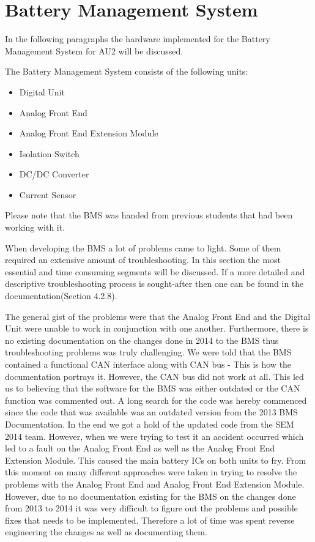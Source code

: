 \section{Battery Management System}
In the following paragraphs the hardware implemented for the Battery Management System for AU2 will be discussed. 

The Battery Management System consists of the following units:
\begin{itemize}
	\item{Digital Unit}
	\item{Analog Front End}
	\item{Analog Front End Extension Module}
	\item{Isolation Switch}
	\item{DC/DC Converter}
	\item{Current Sensor}
\end{itemize}

Please note that the BMS was handed from previous students that had been working with it. 


When developing the BMS a lot of problems came to light. Some of them required an extensive amount of troubleshooting. In this section the most essential and time consuming segments will be discussed. If a more detailed and descriptive troubleshooting process is sought-after then one can be found in the documentation\cite{AU2}(Section 4.2.8).

The general gist of the problems were that the Analog Front End and the Digital Unit were unable to work in conjunction with one another. Furthermore, there is no existing documentation on the changes done in 2014 to the BMS thus troubleshooting problems was truly challenging.
We were told that the BMS contained a functional CAN interface along with CAN bus - This is how the documentation portrays it. However, the CAN bus did not work at all. This led us to believing that the software for the BMS was either outdated or the CAN function was commented out. A long search for the code was hereby commenced since the code that was available was an outdated version from the 2013 BMS Documentation\cite{BMSDocumentation}. In the end we got a hold of the updated code from the SEM 2014 team. However, when we were trying to test it an accident occurred which led to a fault on the Analog Front End as well as the Analog Front End Extension Module. This caused the main battery ICs on both units to fry.
From this moment on many different approaches were taken in trying to resolve the problems with the Analog Front End and Analog Front End Extension Module. However, due to no documentation existing for the BMS on the changes done from 2013 to 2014 it was very difficult to figure out the problems and possible fixes that needs to be implemented. Therefore a lot of time was spent reverse engineering the changes as well as documenting them. 

